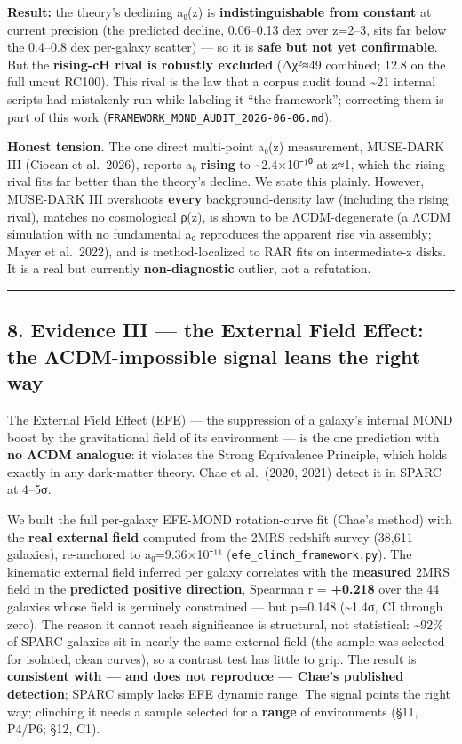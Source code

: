 \documentclass[
]{article}
\begin{document}
\textbf{Result:} the theory's declining a₀(z) is
\textbf{indistinguishable from constant} at current precision (the
predicted decline, 0.06--0.13 dex over z=2--3, sits far below the
0.4--0.8 dex per-galaxy scatter) --- so it is \textbf{safe but not yet
confirmable}. But the \textbf{rising-cH rival is robustly excluded}
(Δχ²≈49 combined; 12.8 on the full uncut RC100). This rival is the law
that a corpus audit found \textasciitilde21 internal scripts had
mistakenly run while labeling it ``the framework''; correcting them is
part of this work (\texttt{FRAMEWORK\_MOND\_AUDIT\_2026-06-06.md}).

\textbf{Honest tension.} The one direct multi-point a₀(z) measurement,
MUSE-DARK III (Ciocan et al.~2026), reports a₀ \textbf{rising} to
\textasciitilde2.4×10⁻¹⁰ at z≈1, which the rising rival fits far better
than the theory's decline. We state this plainly. However, MUSE-DARK III
overshoots \textbf{every} background-density law (including the rising
rival), matches no cosmological ρ(z), is shown to be ΛCDM-degenerate (a
ΛCDM simulation with no fundamental a₀ reproduces the apparent rise via
assembly; Mayer et al.~2022), and is method-localized to RAR fits on
intermediate-z disks. It is a real but currently \textbf{non-diagnostic}
outlier, not a refutation.

\begin{center}\rule{0.5\linewidth}{0.5pt}\end{center}

\subsection{8. Evidence III --- the External Field Effect: the
ΛCDM-impossible signal leans the right
way}\label{evidence-iii-the-external-field-effect-the-ux3bbcdm-impossible-signal-leans-the-right-way}

The External Field Effect (EFE) --- the suppression of a galaxy's
internal MOND boost by the gravitational field of its environment --- is
the one prediction with \textbf{no ΛCDM analogue}: it violates the
Strong Equivalence Principle, which holds exactly in any dark-matter
theory. Chae et al.~(2020, 2021) detect it in SPARC at 4--5σ.

We built the full per-galaxy EFE-MOND rotation-curve fit (Chae's method)
with the \textbf{real external field} computed from the 2MRS redshift
survey (38,611 galaxies), re-anchored to a₀=9.36×10⁻¹¹
(\texttt{efe\_clinch\_framework.py}). The kinematic external field
inferred per galaxy correlates with the \textbf{measured} 2MRS field in
the \textbf{predicted positive direction}, Spearman r = \textbf{+0.218}
over the 44 galaxies whose field is genuinely constrained --- but
p=0.148 (\textasciitilde1.4σ, CI through zero). The reason it cannot
reach significance is structural, not statistical: \textasciitilde92\%
of SPARC galaxies sit in nearly the same external field (the sample was
selected for isolated, clean curves), so a contrast test has little to
grip. The result is \textbf{consistent with --- and does not reproduce
--- Chae's published detection}; SPARC simply lacks EFE dynamic range.
The signal points the right way; clinching it needs a sample selected
for a \textbf{range} of environments (§11, P4/P6; §12, C1).
\end{document}
